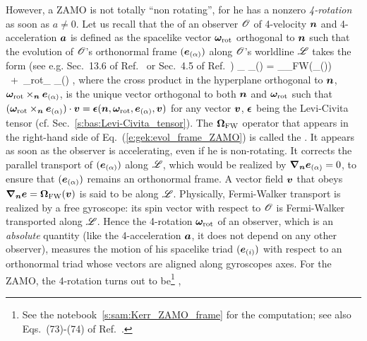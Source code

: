 However, a ZAMO is not totally ``non rotating'', for he has a nonzero \emph{4-rotation}
as soon as $a\neq 0$. Let us recall that
the  of an observer $\mathscr{O}$
of 4-velocity $\bm{n}$ and 4-acceleration $\bm{a}$
is defined as the spacelike vector $\bm{\omega}_{\rm rot}$ orthogonal to $\bm{n}$ such that the evolution of $\mathscr{O}$'s orthonormal frame
$(\bm{e}_{(\alpha)})$ along $\mathscr{O}$'s worldline $\mathscr{L}$ takes the form
(see e.g. Sec.~13.6 of Ref.~\cite{MisneTW73} or Sec.~4.5 of Ref.~\cite{Gourg13})
\be \label{e:gek:evol_frame_ZAMO}
    \wnab_{} _{(\alpha)} = _{\w{\Omega}_{\rm FW}(_{(\alpha)})}
       \  +\  \w{\omega}_{\rm rot}\times_{} _{(\alpha)} ,
\ee
where the cross product in the hyperplane orthogonal to $\bm{n}$, $\bm{\omega}_{\rm rot}\times_{\bm{n}} \bm{e}_{(\alpha)}$, is the unique vector orthogonal to both $\bm{n}$
and $\bm{\omega}_{\rm rot}$ such that
$(\bm{\omega}_{\rm rot}\times_{\bm{n}} \bm{e}_{(\alpha)})\cdot\bm{v} = \bm{\epsilon}(\bm{n}, \bm{\omega}_{\rm rot}, \bm{e}_{(\alpha)}, \bm{v})$ for any vector $\bm{v}$, $\bm{\epsilon}$ being the Levi-Civita tensor (cf. Sec.~\ref{s:bas:Levi-Civita_tensor}).
The $\bm{\Omega}_{\rm FW}$ operator that appears
in the right-hand side of Eq.~(\ref{e:gek:evol_frame_ZAMO}) is called the . It appears as soon as the observer is accelerating, even if he is non-rotating.
It corrects the parallel transport of $(\bm{e}_{(\alpha)})$ along $\mathscr{L}$, which would be realized by
$\bm{\nabla}_{\bm{n}} \bm{e}_{(\alpha)} = 0$, to ensure that $(\bm{e}_{(\alpha)})$ remains an orthonormal
frame. A vector field $\bm{v}$ that obeys $\bm{\nabla}_{\bm{n}} \bm{e} = \bm{\Omega}_{\rm FW}(\bm{v})$ is said
to be  along $\mathscr{L}$. Physically, Fermi-Walker transport is realized by a free gyroscope: its spin vector with respect to $\mathscr{O}$
is Fermi-Walker transported along $\mathscr{L}$. Hence the 4-rotation $\bm{\omega}_{\rm rot}$ of an observer, which is an \emph{absolute}
quantity (like the 4-acceleration $\bm{a}$, it does not depend on any other observer), measures the motion of
his spacelike triad $(\bm{e}_{(i)})$ with respect to an orthonormal triad whose vectors are aligned along
gyroscopes axes. For the ZAMO, the 4-rotation turns out to be\footnote{See the notebook~\ref{s:sam:Kerr_ZAMO_frame} for the computation; see also
Eqs.~(73)-(74) of Ref.~\cite{Semer93}.}
\be \label{e:ker:rot_ZAMO}
   ,
